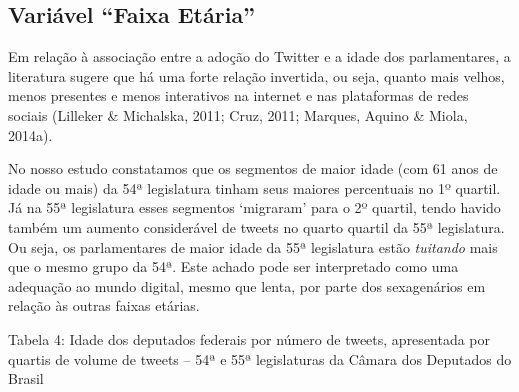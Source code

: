 
\subsection{Variável ``Faixa Etária''}

Em relação à associação entre a adoção do Twitter e a idade dos
parlamentares, a literatura sugere que há uma forte relação invertida,
ou seja, quanto mais velhos, menos presentes e menos interativos na
internet e nas plataformas de redes sociais (Lilleker \& Michalska,
2011; Cruz, 2011; Marques, Aquino \& Miola, 2014a).

No nosso estudo constatamos que os segmentos de maior idade (com 61 anos
de idade ou mais) da 54ª legislatura tinham seus maiores percentuais no
1º quartil. Já na 55ª legislatura esses segmentos `migraram' para o 2º
quartil, tendo havido também um aumento considerável de tweets no quarto
quartil da 55ª legislatura. Ou seja, os parlamentares de maior idade da
55ª legislatura estão \emph{tuitando} mais que o mesmo grupo da 54ª.
Este achado pode ser interpretado como uma adequação ao mundo digital,
mesmo que lenta, por parte dos sexagenários em relação às outras faixas
etárias.

\begin{center}
Tabela 4: Idade dos deputados federais por número de tweets,
apresentada por quartis de volume de tweets -- 54ª e 55ª legislaturas da
Câmara dos Deputados do Brasil
\end{center}

